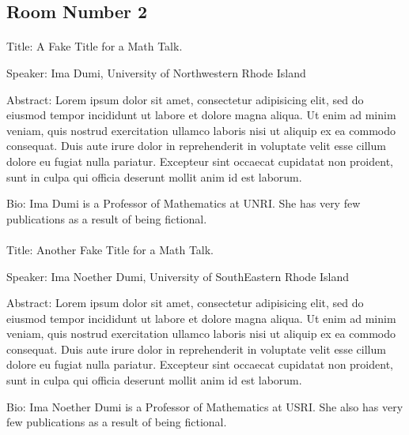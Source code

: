 \documentclass[10pt,]{article}
\theoremstyle{plain}
\begin{document}
\subsection[{Room Number 2}]{Room Number 2}\label{subsection-2}
\typeout{************************************************}
\typeout{************************************************}
\paragraph[{}]{}\hypertarget{paragraphs-5}{}
\hypertarget{p-18}{}%
Title: A Fake Title for a Math Talk.%
\par
\hypertarget{p-19}{}%
Speaker: Ima Dumi, University of Northwestern Rhode Island%
\par
\hypertarget{p-20}{}%
Abstract: Lorem ipsum dolor sit amet, consectetur adipisicing elit, sed do eiusmod tempor incididunt ut labore et dolore magna aliqua. Ut enim ad minim veniam, quis nostrud exercitation ullamco laboris nisi ut aliquip ex ea commodo consequat. Duis aute irure dolor in reprehenderit in voluptate velit esse cillum dolore eu fugiat nulla pariatur. Excepteur sint occaecat cupidatat non proident, sunt in culpa qui officia deserunt mollit anim id est laborum.%
\par
\hypertarget{p-21}{}%
Bio: Ima Dumi is a Professor of Mathematics at UNRI.  She has very few publications as a result of being fictional.%
\typeout{************************************************}
\typeout{************************************************}
\paragraph[{}]{}\hypertarget{paragraphs-6}{}
\hypertarget{p-22}{}%
Title: Another Fake Title for a Math Talk.%
\par
\hypertarget{p-23}{}%
Speaker: Ima Noether Dumi, University of SouthEastern Rhode Island%
\par
\hypertarget{p-24}{}%
Abstract: Lorem ipsum dolor sit amet, consectetur adipisicing elit, sed do eiusmod tempor incididunt ut labore et dolore magna aliqua. Ut enim ad minim veniam, quis nostrud exercitation ullamco laboris nisi ut aliquip ex ea commodo consequat. Duis aute irure dolor in reprehenderit in voluptate velit esse cillum dolore eu fugiat nulla pariatur. Excepteur sint occaecat cupidatat non proident, sunt in culpa qui officia deserunt mollit anim id est laborum.%
\par
\hypertarget{p-25}{}%
Bio: Ima Noether Dumi is a Professor of Mathematics at USRI.  She also has very few publications as a result of being fictional.%
\typeout{************************************************}
\typeout{************************************************}
\end{document}
